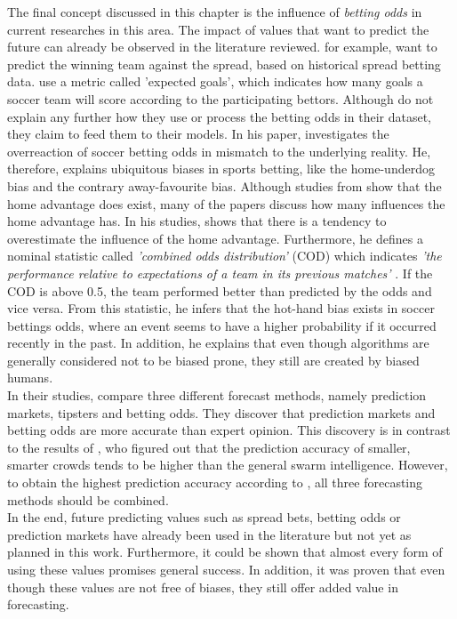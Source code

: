 The final concept discussed in this chapter is the influence of \emph{betting odds} in current researches in this area. The impact of values that want to predict the future can already be observed in the literature reviewed. \citet{landers_machine_2017} for example, want to predict the winning team against the spread, based on historical spread betting data. \citet{shah_poisson_2021} use a metric called 'expected goals', which indicates how many goals a soccer team will score according to the participating bettors. Although \citet{deng_analysis_2020} do not explain any further how they use or process the betting odds in their dataset, they claim to feed them to their models. In his paper, \citet{wheatcroft_profiting_2020} investigates the overreaction of soccer betting odds in mismatch to the underlying reality. He, therefore, explains ubiquitous biases in sports betting, like the home-underdog bias and the contrary away-favourite bias. Although studies from \citet{nevill_home_1999} show that the home advantage does exist, many of the papers discuss how many influences the home advantage has. \parencite{bonomo_mathematical_2014, landers_machine_2017,shah_poisson_2021,deng_analysis_2020} In his studies, \citet{wheatcroft_profiting_2020} shows that there is a tendency to overestimate the influence of the home advantage. Furthermore, he defines a nominal statistic called \emph{'combined odds distribution'} (COD) which indicates \emph{'the performance relative to expectations of a team in its previous matches'} \parencite[, p. 4]{wheatcroft_profiting_2020}. If the COD is above 0.5, the team performed better than predicted by the odds and vice versa. From this statistic, he infers that the hot-hand bias exists in soccer bettings odds, where an event seems to have a higher probability if it occurred recently in the past. In addition, he explains that even though algorithms are generally considered not to be biased prone, they still are created by biased humans. \\
In their studies, \citet{spann_sports_2009} compare three different forecast methods, namely prediction markets, tipsters and betting odds. They discover that prediction markets and betting odds are more accurate than expert opinion. This discovery is in contrast to the results of \citet{goldstein_wisdom_2014}, who figured out that the prediction accuracy of smaller, smarter crowds tends to be higher than the general swarm intelligence. However, to obtain the highest prediction accuracy according to \citet{spann_sports_2009}, all three forecasting methods should be combined. \\
In the end, future predicting values such as spread bets, betting odds or prediction markets have already been used in the literature but not yet as planned in this work. Furthermore, it could be shown that almost every form of using these values promises general success. In addition, it was proven that even though these values are not free of biases, they still offer added value in forecasting.

